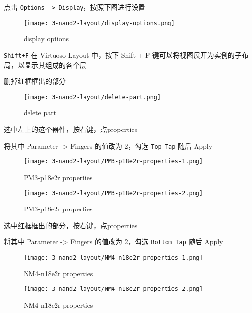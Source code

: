 \documentclass{theme-2614084}
\begin{document}
点击 \texttt{Options -> Display}，按照下图进行设置

\begin{figure}[H]
  \centering\texttt{[image: 3-nand2-layout/display-options.png]}
  \caption{display options}
\end{figure}

\texttt{Shift+F} 在 Virtuoso Layout 中，按下 Shift + F 键可以将视图展开为实例的子布局，以显示其组成的各个层

删掉红框框出的部分

\begin{figure}[H]
  \centering\texttt{[image: 3-nand2-layout/delete-part.png]}
  \caption{delete part}
\end{figure}

选中左上的这个器件，按右键，点properties

将其中 Parameter -> Fingers 的值改为 2，勾选 \texttt{Top Tap} 随后 Apply

\begin{figure}[htbp]
  \centering\begin{minipage}[t]{0.48\textwidth}
      \centering\texttt{[image: 3-nand2-layout/PM3-p18e2r-properties-1.png]}
      \caption{PM3-p18e2r properties}
  \end{minipage}
  \centering\begin{minipage}[t]{0.48\textwidth}
      \centering\texttt{[image: 3-nand2-layout/PM3-p18e2r-properties-2.png]}
      \caption{PM3-p18e2r properties}
  \end{minipage}
\end{figure}

选中红框框出的部分，按右键，点properties

将其中 Parameter -> Fingers 的值改为 2，勾选 \texttt{Bottom Tap} 随后 Apply

\begin{figure}[htbp]
  \centering\begin{minipage}[t]{0.48\textwidth}
      \centering\texttt{[image: 3-nand2-layout/NM4-n18e2r-properties-1.png]}
      \caption{NM4-n18e2r properties}
  \end{minipage}
  \centering\begin{minipage}[t]{0.48\textwidth}
      \centering\texttt{[image: 3-nand2-layout/NM4-n18e2r-properties-2.png]}
      \caption{NM4-n18e2r properties}
  \end{minipage}
\end{figure}
\end{document}
